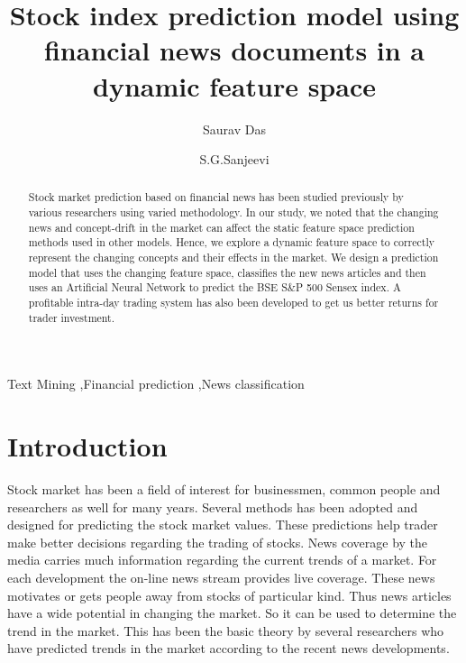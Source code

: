 \documentclass[review,twocolumn,5p]{elsarticle}
\begin{document}
\begin{frontmatter}

\title{Stock index prediction model using financial news documents in a dynamic feature space}
\author[rvt]{Saurav Das}
\author[rvt]{S.G.Sanjeevi}
\address[rvt]{National Institute of Technology, Warangal - 506004, India}
\date{}

\begin{abstract}
Stock market prediction based on financial news has been studied previously by various researchers using varied methodology. In our study, we noted that the changing news and concept-drift in the market can affect the static feature space prediction methods used in other models. Hence, we explore a dynamic feature space to correctly represent the changing concepts and their effects in the market. We design a prediction model that uses the changing feature space, classifies the new news articles and then uses an Artificial Neural Network to predict the BSE S\&P 500 Sensex index. A profitable intra-day trading system has also been developed to get us better returns for trader investment. 
\end{abstract}
\begin{keyword}
Text Mining \sep Financial prediction \sep News classification
\end{keyword}
\end{frontmatter}
\section{Introduction}
\label{sec:introduction}

Stock market has been a field of interest for businessmen, common people and researchers as well for many years. Several methods has been adopted and designed for predicting the stock market values. These predictions help trader make better decisions regarding the trading of stocks. News coverage by the media carries much information regarding the current trends of a market. For each development the on-line news stream provides live coverage. These news motivates or gets people away from stocks of particular kind. Thus news articles have a wide potential in changing the market. So it can be used to determine the trend in the market. This has been the basic theory by several researchers who have predicted trends in the market according to the recent news developments.
\end{document}
